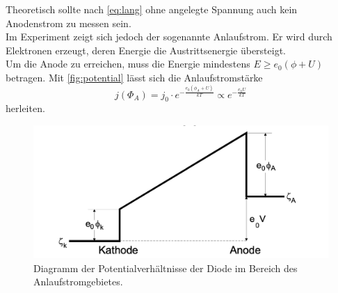 Theoretisch sollte nach \autoref{eq:lang} ohne angelegte Spannung auch kein Anodenstrom zu messen sein. \\
Im Experiment zeigt sich jedoch der sogenannte Anlaufstrom. 
Er wird durch Elektronen erzeugt, deren Energie die Austrittsenergie übersteigt. \\
Um die Anode zu erreichen, muss die Energie mindestens $E \geq e_0 (\phi + U)$ betragen.
Mit \autoref{fig:potential} lässt sich die Anlaufstromstärke 
\begin{equation}
  j(\Phi_A)= j_0 \cdot e^{- \frac{e_0(\phi_A + U)}{kT}} \propto e^{- \frac{e_0 U}{kT}}
\end{equation} 
herleiten. \\
\begin{figure}
  \centering
  \includegraphics[width=\textwidth]{content/potential}
  \caption{Diagramm der Potentialverhältnisse der Diode im Bereich des Anlaufstromgebietes.\cite{sample}}
  \label{fig:potential}
\end{figure}


